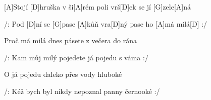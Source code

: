 
[A]Stojí [D]hruška v ši[A]rém poli
vrš[D]ek se jí [G]zele[A]ná

/: Pod [D]ní se [G]pase [A]kůň vra[D]ný
pase ho [A]má milá[D] :/

Proč má milá dnes pásete
z večera do rána

/: Kam můj milý pojedete
já pojedu s váma :/

O já pojedu daleko
přes vody hluboké

/: Kéž bych byl nikdy nepoznal
panny černooké :/

